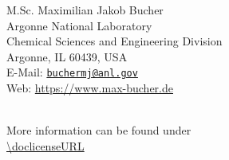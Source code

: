 \begin{flushleft}
{\Large M.Sc. Maximilian Jakob Bucher}\\
\footnotesize{Argonne National Laboratory\\
Chemical Sciences and Engineering Division\\
Argonne, IL 60439, USA\\
E-Mail: \href{mailto:buchermj@anl.gov}{\nolinkurl{buchermj@anl.gov} }\\
Web: \url{https://www.max-bucher.de}}
\end{flushleft}
\vspace{14cm}
\doclicenseThis\\
More information can be found under\\ \url{\doclicenseURL}
